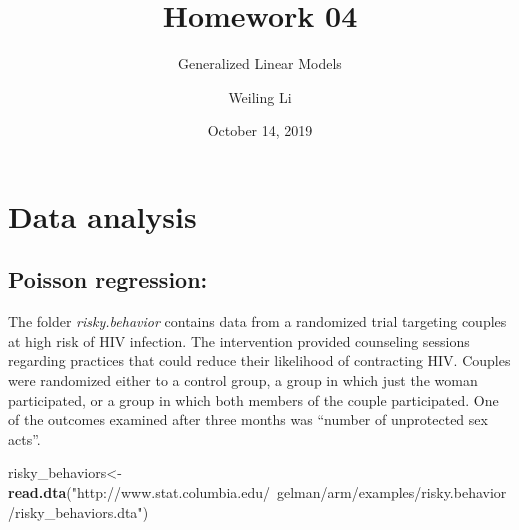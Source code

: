 \documentclass[]{article}
\title{Homework 04}
\subtitle{Generalized Linear Models}
\author{Weiling Li}
\date{October 14, 2019}
\newenvironment{Shaded}{\begin{snugshade}}{\end{snugshade}}
\newcommand{\CharTok}[1]{\textcolor[rgb]{0.31,0.60,0.02}{#1}}
\newcommand{\DataTypeTok}[1]{\textcolor[rgb]{0.13,0.29,0.53}{#1}}
\newcommand{\KeywordTok}[1]{\textcolor[rgb]{0.13,0.29,0.53}{\textbf{#1}}}
\newcommand{\NormalTok}[1]{#1}
\newcommand{\OperatorTok}[1]{\textcolor[rgb]{0.81,0.36,0.00}{\textbf{#1}}}
\newcommand{\OtherTok}[1]{\textcolor[rgb]{0.56,0.35,0.01}{#1}}
\newcommand{\StringTok}[1]{\textcolor[rgb]{0.31,0.60,0.02}{#1}}
\begin{document}
\maketitle

\begin{Shaded}
\end{Shaded}

\hypertarget{data-analysis}{%
\section{Data analysis}\label{data-analysis}}

\hypertarget{poisson-regression}{%
\subsection{Poisson regression:}\label{poisson-regression}}

The folder \emph{risky.behavior} contains data from a randomized trial
targeting couples at high risk of HIV infection. The intervention
provided counseling sessions regarding practices that could reduce their
likelihood of contracting HIV. Couples were randomized either to a
control group, a group in which just the woman participated, or a group
in which both members of the couple participated. One of the outcomes
examined after three months was ``number of unprotected sex acts''.

\begin{Shaded}
\begin{Highlighting}[]
\NormalTok{risky_behaviors<-}\KeywordTok{read.dta}\NormalTok{(}\StringTok{"http://www.stat.columbia.edu/~gelman/arm/examples/risky.behavior/risky_behaviors.dta"}\NormalTok{)}
\end{Highlighting}
\end{Shaded}
\end{document}
